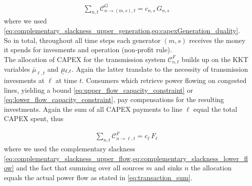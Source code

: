 \documentclass[11pt]{article}
\newcommand{\ubar}[1]{\underaccent{\bar}{#1}}
\newcommand{\note}[1]{\textcolor{Orange}{#1}}
\newcommand{\generation}[1][n]{g_{#1,s,t}}
\newcommand{\capacityGeneration}{G_{n,s}}
\newcommand{\capacityFlow}{F_{\ell}}
\newcommand{\capexGeneration}{c_{n,s}}
\newcommand{\capexFlow}{c_{\ell}}
\newcommand{\opexGeneration}[1][n]{o_{#1,s}}
\newcommand{\demand}[1][n]{d_{#1,a,t}}
\newcommand{\incidence}[1][n]{K_{#1,\ell}}
\newcommand{\mulowergeneration}[1][n]{\ubar{\mu}_{#1,s,t}}
\newcommand{\muuppergeneration}[1][n]{\bar{\mu}_{#1,s,t}}
\newcommand{\mulowerflow}{\ubar{\mu}_{\ell,t}}
\newcommand{\muupperflow}{\bar{\mu}_{\ell,t}}
\newcommand{\lmp}[1][n]{\lambda_{#1,t}}
\newcommand{\flow}{f_{\ell,t}}
\newcommand{\allocateCapexGeneration}[1][n]{\mathcal{C}^{G}_{#1,t}}
\newcommand{\allocateCapexFlow}[1][n]{\mathcal{C}^{F}_{#1,t}}
\newcommand{\Forall}[1]{\hspace{20pt} \forall \,\, #1 }
\begin{document}
\begin{align}
 \sum_{n,t} \allocateCapexGeneration[n \rightarrow (m,s)] = \capexGeneration \, \capacityGeneration
\label{eq:no_profit_capex_generation}
\end{align}
where we used \cref{eq:complementary_slackness_upper_generation,eq:capexGeneration_duality}. So in total, throughout all time steps each generator $(m,s)$ receives the money it spends for invesments and operation (non-profit rule). 
\\ 

The allocation of CAPEX for the transmission system $\allocateCapexFlow$ builds up on the KKT variables $\muupperflow$ and $\mulowerflow$. Again the latter translate to the necessity of transmission invesments at $\ell$ at time $t$. Consumers which retrieve power flowing on congested lines, yielding a bound \cref{eq:upper_flow_capacity_constraint} or \eqref{eq:lower_flow_capacity_constraint}, pay compensations for the resulting investments. Again the sum of all CAPEX payments to line $\ell$ equal the total CAPEX spent, thus

\begin{align}
 \sum_{n,t} \allocateCapexFlow[n \rightarrow \ell] = \capexFlow \, \capacityFlow  
\end{align}
where we used the complementary slackness \cref{eq:complementary_slackness_upper_flow,eq:complementary_slackness_lower_flow} and the fact that summing over all sources $m$ and sinks $n$ the allocation equals the actual power flow as stated in \cref{eq:transaction_sum}. 
\end{document}
